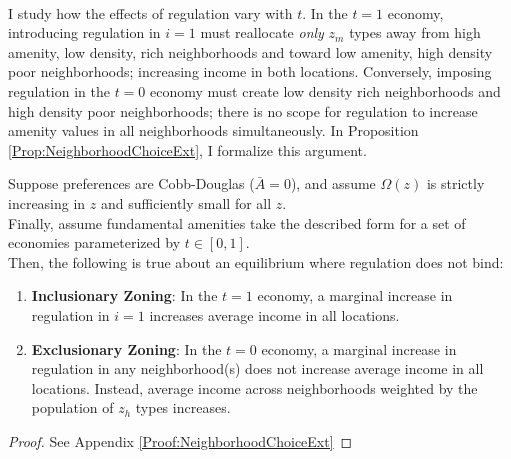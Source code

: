\documentclass[12pt]{article}
\begin{document}
\paragraph*{} 
I study how the effects of regulation vary with $t$. In the $t = 1$ economy, introducing regulation in $i = 1$ must reallocate \textit{only} $z_{m}$ types away from high amenity, low density, rich neighborhoods and toward low amenity, high density poor neighborhoods; increasing income in both locations. Conversely, imposing regulation in the $t = 0$ economy must create low density rich neighborhoods and high density poor neighborhoods; there is no scope for regulation to increase amenity values in all neighborhoods simultaneously. In Proposition \ref{Prop:NeighborhoodChoiceExt}, I formalize this argument.

\begin{Proposition}\label{Prop:NeighborhoodChoiceExt}
	Suppose preferences are Cobb-Douglas ($\bar{A} = 0$), and assume $\Omega(z)$ is strictly increasing in $z$ and sufficiently small for all $z$. \\
	Finally, assume fundamental amenities take the described form for a set of economies parameterized by $t \in [0, 1]$. \\
	Then, the following is true about an equilibrium where regulation does not bind:
	
	\begin{enumerate}
		\item \textbf{Inclusionary Zoning}: In the $t = 1$ economy, a marginal increase in regulation in $i = 1$ increases average income in all locations.
		
		\item \textbf{Exclusionary Zoning}: In the $t = 0$ economy, a marginal increase in regulation in any neighborhood(s) does not increase average income in all locations. Instead, average income across neighborhoods weighted by the population of $z_{h}$ types increases. 
	\end{enumerate}
\end{Proposition}
\begin{proof}
	See Appendix \ref{Proof:NeighborhoodChoiceExt}
\end{proof}
\end{document}

